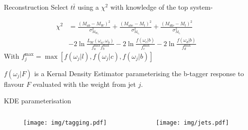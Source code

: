 \documentclass{beamer}
\begin{document}

\begin{frame}{Reconstruction}
Select $t\bar{t}$ using a $\chi^2$ with knowledge of the top system-

\begin{equation*}\begin{split}
  \chi^2 &= \frac{\left(M_{ab} - M_W\right)^2}{\sigma^2_{M_{W_h}}} + \frac{\left(M_{abc} - M_t\right)^2}{\sigma^2_{M_{t_h}}} + \frac{\left(M_{dl\nu} - M_t\right)^2}{\sigma^2_{M_{t_l}}} \\
  &-2\ln{\frac{L_{W}\left( \omega_{a},\omega_{b} \right)}{f^{\text{max}}_{a} f^{\text{max}}_{b}}} -2\ln{\frac{f\left(\omega_{c} \big| b\right)}{f^{\text{max}}_{c}}} -2\ln{\frac{f\left(\omega_{d} \big| b\right)}{f^{\text{max}}_{d}}}
\end{split}\end{equation*}
With $f^{\text{max}}_j = \max\left[f\left(\omega_{j} \big| l\right), f\left(\omega_{j} \big| c\right), f\left(\omega_{j} \big| b\right)\right]$

$f\left( \omega_{j} \big| F\right)$ is a Kernal Density Estimator parameterising the b-tagger response to flavour $F$ evaluated with the weight from jet $j$.
\end{frame}

\begin{frame}{KDE parameterisation}
  \begin{columns}
    \begin{column}{0.5\textwidth}\begin{figure}
      \centering
      \texttt{[image: img/tagging.pdf]}
    \end{figure}\end{column}
    \begin{column}{0.5\textwidth}\begin{figure}
       \texttt{[image: img/jets.pdf]}
    \end{figure}\end{column}
  \end{columns}
\end{frame}
\end{document}
